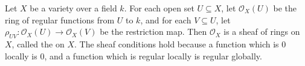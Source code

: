 Let $X$ be a variety over a field $k$. For each open set $U \subseteq X$, let $\mathcal{O}_X(U)$ be the ring of regular functions from $U$ to $k$, and for each $V \subseteq U$, let $\rho_{UV} : \mathcal{O}_X(U) \to \mathcal{O}_X(V)$ be the restriction map. Then $\mathcal{O}_X$ is a sheaf of rings on $X$, called the  on $X$. The sheaf conditions hold because a function which is $0$ locally is $0$, and a function which is regular locally is regular globally.
